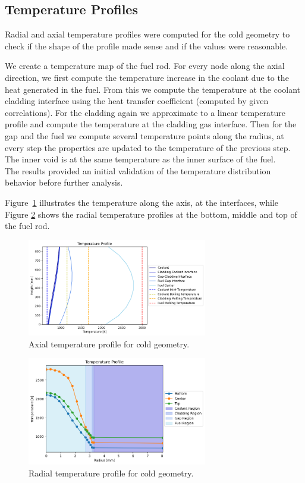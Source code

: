 \subsection{Temperature Profiles}
Radial and axial temperature profiles were computed for the cold geometry to check if the shape of the profile made sense and if the values were reasonable.

We create a temperature map of the fuel rod. For every node along the axial direction, we first compute the temperature increase in the coolant due to the heat generated in the fuel. 
From this we compute the temperature at the coolant cladding interface using the heat transfer coefficient (computed by given correlations).
For the cladding again we approximate to a linear temperature profile and compute the temperature at the cladding gas interface.
Then for the gap and the fuel we compute several temperature points along the radius, at every step the properties are updated to the temperature of the previous step.
The inner void is at the same temperature as the inner surface of the fuel. \\

The results provided an initial validation of the temperature distribution behavior before further analysis.

Figure~\ref{fig:axial_temp_profile} illustrates the temperature along the axis, at the interfaces, while Figure \ref{fig:radial_temp_profile} shows the radial temperature profiles at the bottom, middle and top of the fuel rod.

\begin{figure}[H]
\centering
\includegraphics[width=0.7\textwidth]{axial_temp_profile_cold.png}
\caption{Axial temperature profile for cold geometry.}
\label{fig:axial_temp_profile}
\end{figure}

\begin{figure}[H]
\centering
\includegraphics[width=0.7\textwidth]{radial_temp_profile_cold.png}
\caption{Radial temperature profile for cold geometry.}
\label{fig:radial_temp_profile}
\end{figure}
